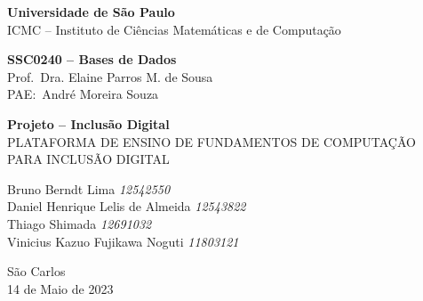 \begin{capa}
    \begin{center}

        \vspace{1cm}

        {\Large\textbf{Universidade de São Paulo}} \\
        {\Large ICMC -- Instituto de Ciências Matemáticas e de Computação}\\

        \vspace{3cm}

        {
            \large
            \textbf{SSC0240 -- Bases de Dados} \\
            Prof.\ Dra. Elaine Parros M. de Sousa \\
            PAE:\ André Moreira Souza
        }

        \vspace{3cm}

        {\Large \textbf{Projeto -- Inclusão Digital}}\\
        {\large \uppercase{Plataforma de ensino de fundamentos de computação para inclusão digital}}\\

        \vspace{3cm}

        \begin{flushright}
            {
            {Bruno Berndt Lima \; \textit{12542550}} \\
            {Daniel Henrique Lelis de Almeida \; \textit{12543822}} \\
            {Thiago Shimada \; \textit{12691032}} \\
            {Vinicius Kazuo Fujikawa Noguti \; \textit{11803121}}
            }
        \end{flushright}

        \vfill

        {
            \large
            São Carlos \\
            14 de Maio de 2023
        }

    \end{center}
\end{capa}

